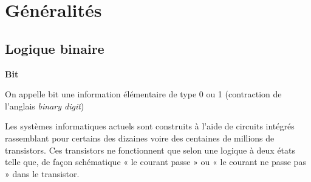 \documentclass[10pt,fleqn]{article} %
\begin{document}







\section{Généralités \cite{cf}}

\subsection{Logique binaire}


\begin{defi}
\textbf{Bit}

On appelle bit une information élémentaire de type 0 ou 1 (contraction de l'anglais \textit{binary digit})

\end{defi}

Les systèmes informatiques actuels sont construits à l’aide de circuits intégrés rassemblant pour certains des dizaines voire des centaines de millions de transistors. Ces transistors ne fonctionnent que selon une logique à deux états telle que, de façon schématique « le courant passe » ou « le courant ne passe pas » dans le transistor. 
\end{document}
